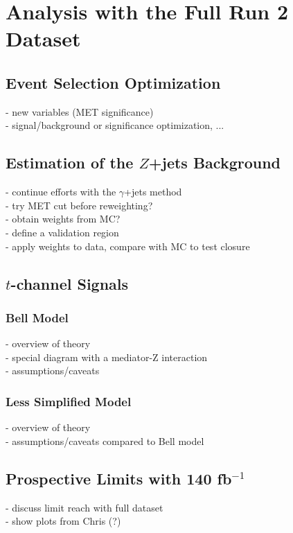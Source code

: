\chapter{Analysis with the Full Run 2 Dataset}
\label{chapter:fullRun2}

\section{Event Selection Optimization}
- new variables (MET significance)\\
- signal/background or significance optimization, ...\\

\section{Estimation of the $Z$+jets Background}

- continue efforts with the $\gamma$+jets method\\
- try MET cut before reweighting?\\
- obtain weights from MC?\\
- define a validation region\\
- apply weights to data, compare with MC to test closure\\

\section{$t$-channel Signals}

\subsection{Bell Model}

- overview of theory\\
- special diagram with a mediator-Z interaction\\
- assumptions/caveats\\

\subsection{Less Simplified Model}

- overview of theory\\
- assumptions/caveats compared to Bell model\\

\section{Prospective Limits with 140 fb$^{-1}$}

- discuss limit reach with full dataset\\
- show plots from Chris (?)\\